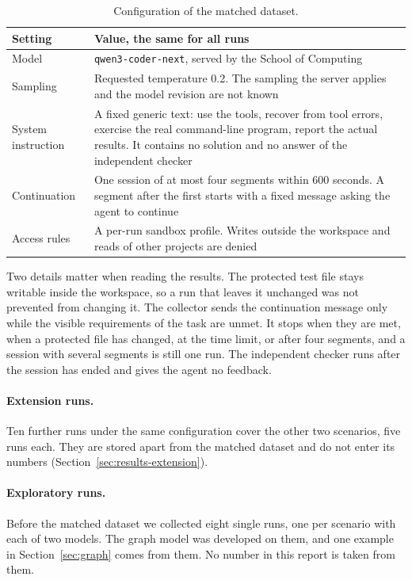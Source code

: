 \begin{table}[H]
\centering\small
\begin{tabularx}{\textwidth}{@{}L{0.24\textwidth} X@{}}
\toprule
Setting & Value, the same for all runs \\
\midrule
Model & \texttt{qwen3-coder-next}, served by the School of Computing \\
Sampling & Requested temperature 0.2. The sampling the server applies and the model revision are not known \\
System instruction & A fixed generic text: use the tools, recover from tool errors, exercise the real command-line program, report the actual results. It contains no solution and no answer of the independent checker \\
Continuation & One session of at most four segments within 600 seconds. A segment after the first starts with a fixed message asking the agent to continue \\
Access rules & A per-run sandbox profile. Writes outside the workspace and reads of other projects are denied \\
\bottomrule
\end{tabularx}
\caption{Configuration of the matched dataset.}
\label{tab:config}
\end{table}

Two details matter when reading the results.
The protected test file stays writable inside the workspace, so a run that leaves it unchanged was not prevented from changing it.
The collector sends the continuation message only while the visible requirements of the task are unmet.
It stops when they are met, when a protected file has changed, at the time limit, or after four segments, and a session with several segments is still one run.
The independent checker runs after the session has ended and gives the agent no feedback.

\paragraph{Extension runs.}
Ten further runs under the same configuration cover the other two scenarios, five runs each.
They are stored apart from the matched dataset and do not enter its numbers (Section~\ref{sec:results-extension}).

\paragraph{Exploratory runs.}
Before the matched dataset we collected eight single runs, one per scenario with each of two models.
The graph model was developed on them, and one example in Section~\ref{sec:graph} comes from them.
No number in this report is taken from them.

